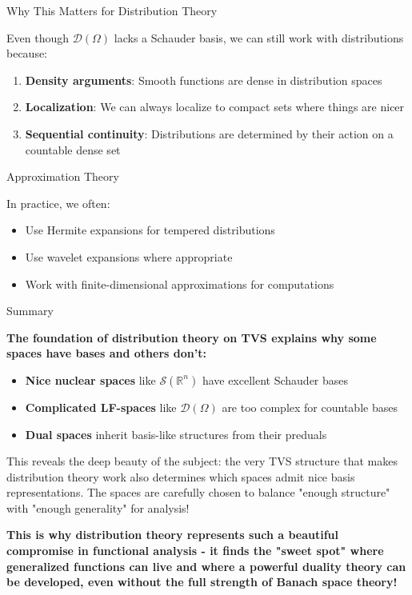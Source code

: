\documentclass[aps,preprint]{revtex4}
\newenvironment{answer}
  {\begin{tcolorbox}[colback=green!5!white,colframe=green!75!black,title=Answer]}
  {\end{tcolorbox}}
\begin{document}
\begin{answer}
Why This Matters for Distribution Theory

Even though $\mathcal{D}(\Omega)$ lacks a Schauder basis, we can still work
with distributions because:

\begin{enumerate}
\item \textbf{Density arguments}: Smooth functions are dense in distribution
spaces

\item \textbf{Localization}: We can always localize to compact sets where
things are nicer

\item \textbf{Sequential continuity}: Distributions are determined by their
action on a countable dense set
\end{enumerate}

Approximation Theory

In practice, we often:

\begin{itemize}
\item Use Hermite expansions for tempered distributions

\item Use wavelet expansions where appropriate

\item Work with finite-dimensional approximations for computations
\end{itemize}

Summary

\textbf{The foundation of distribution theory on TVS explains why some
spaces have bases and others don't:}

\begin{itemize}
\item \textbf{Nice nuclear spaces} like $\mathcal{S}(\mathbb{R}^n)$ have
excellent Schauder bases

\item \textbf{Complicated LF-spaces} like $\mathcal{D}(\Omega)$ are too
complex for countable bases

\item \textbf{Dual spaces} inherit basis-like structures from their preduals
\end{itemize}

This reveals the deep beauty of the subject: the very TVS structure that
makes distribution theory work also determines which spaces admit nice basis
representations. The spaces are carefully chosen to balance "enough
structure" with "enough generality" for analysis!

\textbf{This is why distribution theory represents such a beautiful
compromise in functional analysis - it finds the "sweet spot" where
generalized functions can live and where a powerful duality theory can be
developed, even without the full strength of Banach space theory!}
\end{answer}
\end{document}
